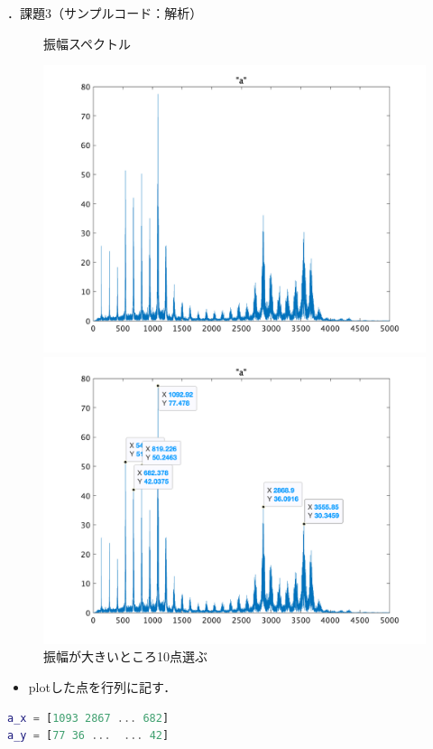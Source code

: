 \documentclass[aspectratio=43]{beamer}
\newcommand{\showsec}{\thesection ．}
\begin{document}
\begin{frame}[t,containsverbatim]{\showsec 課題3（サンプルコード：解析）}
    \begin{figure}
        \centering
        \begin{minipage}{0.48\textwidth}
            \centering
            \caption{振幅スペクトル}
            \includegraphics[keepaspectratio,width=\textwidth]{freq.png}
        \end{minipage}
        \begin{minipage}{0.48\textwidth}
            \centering
            \caption{振幅が大きいところ10点選ぶ}
            \includegraphics[keepaspectratio,width=\textwidth]{pointselect.png}
        \end{minipage}
    \end{figure}
    \begin{itemize}
        \item plotした点を行列に記す．
    \end{itemize}
    \begin{lstlisting}[language={Matlab},firstnumber={last}]
a_x = [1093 2867 ... 682]
a_y = [77 36 ...  ... 42]
    \end{lstlisting}
\end{frame}
\end{document}
